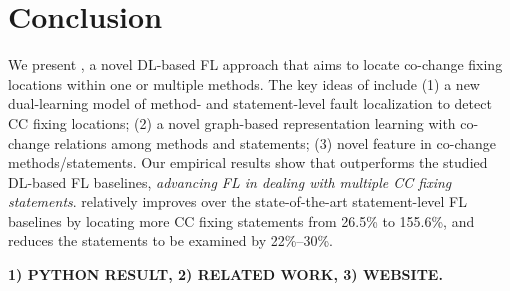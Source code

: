 \section{Conclusion}

We present {\tool}, a novel DL-based FL approach that aims to locate
co-change fixing locations within one or multiple methods. The key
ideas of {\tool} include (1) a new dual-learning model of method- and
statement-level fault localization to detect CC fixing locations; (2)
a novel graph-based representation learning with co-change relations
among methods and statements; (3) novel feature in co-change
methods/statements. Our empirical results show that {\tool}
outperforms the studied DL-based FL baselines, {\em advancing FL in
  dealing with multiple CC fixing statements}.
%
{\tool} relatively improves over the state-of-the-art statement-level
FL baselines by locating more CC fixing statements from 26.5\% to
155.6\%, and reduces the statements to be examined by 22\%--30\%.

{\bf 1) PYTHON RESULT, 2) RELATED WORK, 3) WEBSITE.}

